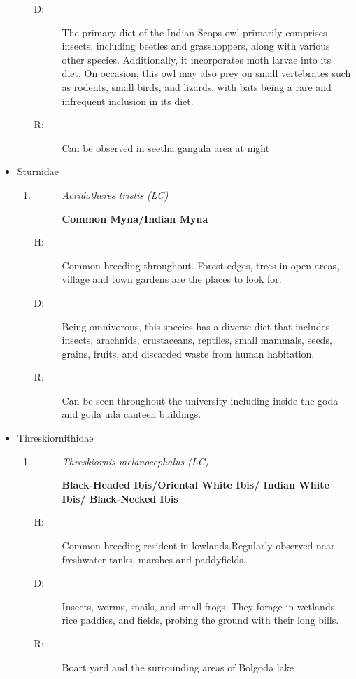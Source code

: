 \begin{itemize}
\begin{enumerate}
\begin{description}
\item[D: ]%
The primary diet of the Indian Scops{-}owl primarily comprises insects, including beetles and grasshoppers, along with various other species. Additionally, it incorporates moth larvae into its diet. On occasion, this owl may also prey on small vertebrates such as rodents, small birds, and lizards, with bats being a rare and infrequent inclusion in its diet.%
\item[R: ]%
Can be observed in seetha gangula area at night%
\end{description}%
\end{enumerate}%
\item%
Sturnidae%
\begin{enumerate}%
\item%
\begin{description}%
\item[]%
\textit{Acridotheres tristis (LC)}%
\item[]%
\textbf{Common Myna/Indian Myna}%
\end{description}%
\begin{description}%
\item[H: ]%
Common breeding throughout. Forest edges, trees in open areas, village and town gardens are the places to look for. %
\item[D: ]%
Being omnivorous, this species has a diverse diet that includes insects, arachnids, crustaceans, reptiles, small mammals, seeds, grains, fruits, and discarded waste from human habitation.%
\item[R: ]%
Can be seen throughout the university including inside the goda and goda uda canteen buildings.%
\end{description}%
\end{enumerate}%
\item%
Threskiornithidae%
\begin{enumerate}%
\item%
\begin{description}%
\item[]%
\textit{Threskiornis melanocephalus (LC)}%
\item[]%
\textbf{Black{-}Headed Ibis/Oriental White Ibis/ Indian White Ibis/ Black{-}Necked Ibis}%
\end{description}%
\begin{description}%
\item[H: ]%
Common breeding resident in lowlands.Regularly observed near freshwater tanks, marshes and paddyfields.%
\item[D: ]%
Insects, worms, snails, and small frogs. They forage in wetlands, rice paddies, and fields, probing the ground with their long bills.%
\item[R: ]%
Boart yard and the surrounding areas of Bolgoda lake%
\end{description}%
\end{enumerate}%
\end{itemize}